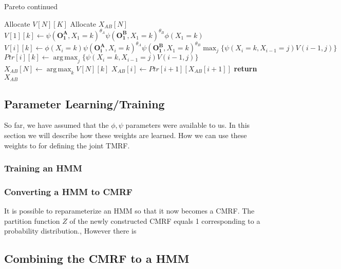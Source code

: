 \documentclass{article}
\DeclareMathOperator*{\argmax}{arg\,max}
\begin{document}
\begin{algorithm}
\caption{Pareto continued} \label{algo:pareto2}
\begin{algorithmic}[1]

	\State Allocate $V[N][K]$ 
	\State Allocate $X_{AB}[N]$	
		\State $V[1][k] \gets \psi(\mathbf{O^A_1},X_1{=}k)^{\theta_A}\psi(\mathbf{O^B_1},X_1{=}k)^{\theta_B}\phi(X_1{=}k)$
	\EndFor	
			\State $V[i][k] \gets \phi(X_i{=}k)\psi(\mathbf{O^A_i},X_i{=}k)^{\theta_A}\psi(\mathbf{O^B_1},X_1{=}k)^{\theta_B}
    \max_{j}\{\psi(X_{i}{=}k,X_{i-1}{=}j)V(i-1,j)\}$
			\State $Ptr[i][k] \gets \argmax_{j}\{\psi(X_{i}{=}k,X_{i-1}{=}j)V(i-1,j)\} $
		\EndFor		
	\EndFor
	\Statex {}
	\State $X_{AB}[N] \gets \argmax_{k}V[N][k]$ 
		\State	$X_{AB}[i] \gets Ptr[i+1][X_{AB}[i+1]]$
	\EndFor
	\State \bf{return} $X_{AB}$
\EndProcedure

\end{algorithmic}
\end{algorithm}

\pagebreak


\subsection{Parameter Learning/Training}
So far, we have assumed that the $\phi,\psi$ parameters were available to us. In this section we will describe how these weights are learned. How we can use these weights to for defining the joint TMRF. 


\subsubsection{Training an HMM}


\subsubsection{Converting a HMM to CMRF}
It is possible to reparameterize an HMM so that it now becomes a CMRF. The partition function $Z$ of the newly constructed CMRF equals 1 corresponding to a probability distribution., However there is 

\subsection{Combining the CMRF to a HMM}
\end{document}
